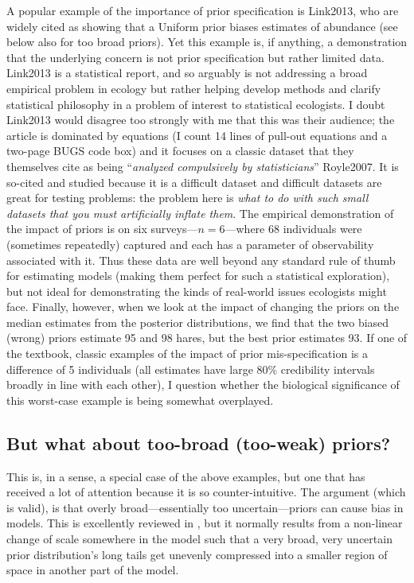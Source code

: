 \documentclass[12pt]{report}
\begin{document}
A popular example of the importance of prior specification is Link2013, who are widely cited as showing that a Uniform prior biases estimates of abundance (see below also for too broad priors). Yet this example is, if anything, a demonstration that the underlying concern is not prior specification but rather limited data. Link2013 is a statistical report, and so arguably is not addressing a broad empirical problem in ecology but rather helping develop methods and clarify statistical philosophy in a problem of interest to statistical ecologists. I doubt Link2013 would disagree too strongly with me that this was their audience; the article is dominated by equations (I count 14 lines of pull-out equations and a two-page BUGS code box) and it focuses on a classic dataset that they themselves cite as being ``\emph{analyzed compulsively by statisticians}'' Royle2007. It is so-cited and studied because it is a difficult dataset and difficult datasets are great for testing problems: the problem here is \emph{what to do with such small datasets that you must artificially inflate them}. The empirical demonstration of the impact of priors is on six surveys---$n=6$---where 68 individuals were (sometimes repeatedly) captured and each has a parameter of observability associated with it. Thus these data are well beyond any standard rule of thumb for estimating models (making them perfect for such a statistical exploration), but not ideal for demonstrating the kinds of real-world issues ecologists might face. Finally, however, when we look at the impact of changing the priors on the median estimates from the posterior distributions, we find that the two biased (wrong) priors estimate 95 and 98 hares, but the best prior estimates 93. If one of the textbook, classic examples of the impact of prior mis-specification is a difference of 5 individuals (all estimates have large 80\% credibility intervals broadly in line with each other), I question whether the biological significance of this worst-case example is being somewhat overplayed.

\subsection*{But what about too-broad (too-weak) priors?}
This is, in a sense, a special case of the above examples, but one that has received a lot of attention because it is so counter-intuitive. The argument (which is valid), is that overly broad---essentially too uncertain---priors can cause bias in models. This is excellently reviewed in \textcite{Banner2020}, but it normally results from a non-linear change of scale somewhere in the model such that a very broad, very uncertain prior distribution's long tails get unevenly compressed into a smaller region of space in another part of the model.
\end{document}
